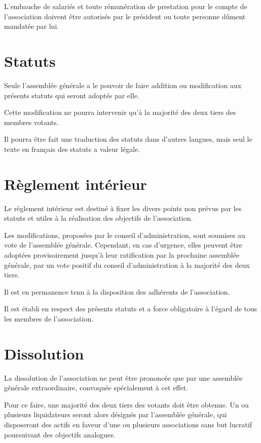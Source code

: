 \documentclass[a4wide,12pt]{scrartcl}
\begin{document}
L'embauche de salariés et toute rémunération de prestation pour le
compte de l'association doivent être autorisés par le président ou
toute personne dûment mandatée par lui.

\section{Statuts}

Seule l'assemblée générale a le pouvoir de faire addition ou
modification aux présents statuts qui seront adoptés par elle.

Cette modification ne pourra intervenir qu'à la majorité des deux
tiers des membres votants.

Il pourra être fait une traduction des statuts dans d'autres langues,
mais seul le texte en français des statuts a valeur légale.

\section{Règlement intérieur}

Le règlement intérieur est destiné à fixer les divers points non
prévus par les statuts et utiles à la réalisation des objectifs de
l'association.

Les modifications, proposées par le conseil d'administration, sont
soumises au vote de l'assemblée générale. Cependant, en cas d'urgence,
elles peuvent être adoptées provisoirement jusqu'à leur ratification
par la prochaine assemblée générale, par un vote positif du conseil
d'administration à la majorité des deux tiers.

Il est en permanence tenu à la disposition des adhérents de
l'association.

Il est établi en respect des présents statuts et a force obligatoire à
l'égard de tous les membres de l'association.

\section{Dissolution}

La dissolution de l'association ne peut être prononcée que par une
assemblée générale extraordinaire, convoquée spécialement à cet effet.

Pour ce faire, une majorité des deux tiers des votants doit être
obtenue. Un ou plusieurs liquidateurs seront alors désignés par
l'assemblée générale, qui disposeront des actifs en faveur d'une ou
plusieurs associations sans but lucratif poursuivant des objectifs
analogues.
\end{document}
